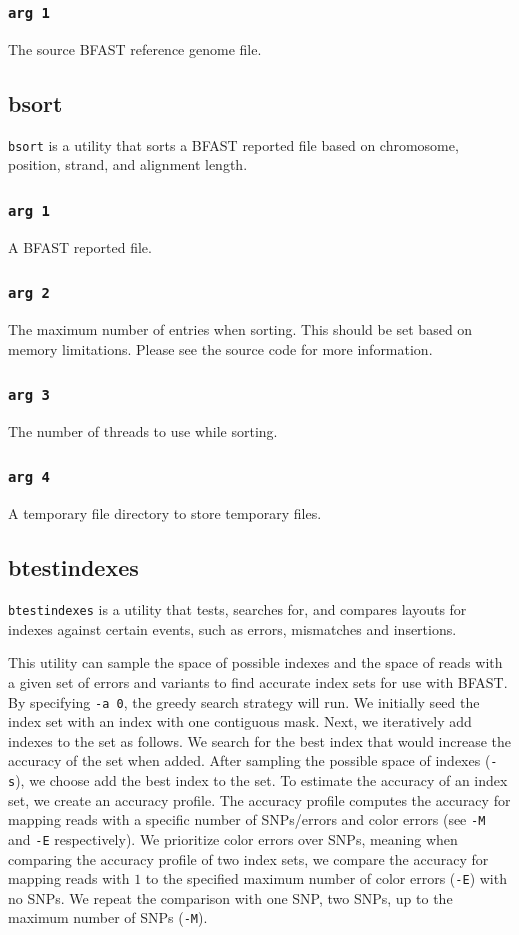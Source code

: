 \documentclass[a4paper,12pt]{book}
\newcommand{\TT}[1]{{\tt #1}} %
\newcommand{\BRGF}{BFAST reference genome file} %
\newcommand{\BRF}{BFAST reported file} %
\begin{document}
\subsubsection{\TT{arg 1}}
The source \BRGF{}.
\subsection{bsort}
\label{sec:bsort}
\TT{bsort} is a utility that sorts a \BRF{} based on chromosome, position, strand, and alignment length.
\subsubsection{\TT{arg 1}}
A \BRF{}.
\subsubsection{\TT{arg 2}}
The maximum number of entries when sorting.
This should be set based on memory limitations.
Please see the source code for more information.
\subsubsection{\TT{arg 3}}
The number of threads to use while sorting.
\subsubsection{\TT{arg 4}}
A temporary file directory to store temporary files.
\subsection{btestindexes}
\label{sec:btestindexes}
\TT{btestindexes} is a utility that tests, searches for, and compares layouts for indexes against certain events, such as errors, mismatches and insertions.

This utility can sample the space of possible indexes and the space of reads with a given set of errors and variants to find accurate index sets for use with BFAST.
By specifying \TT{-a 0}, the greedy search strategy will run.
We initially seed the index set with an index with one contiguous mask.
Next, we iteratively add indexes to the set as follows.
We search for the best index that would increase the accuracy of the set when added.
After sampling the possible space of indexes (\TT{-s}), we choose add the best index to the set.
To estimate the accuracy of an index set, we create an accuracy profile.
The accuracy profile computes the accuracy for mapping reads with a specific number of SNPs/errors and color errors (see \TT{-M} and \TT{-E} respectively).
We prioritize color errors over SNPs, meaning when comparing the accuracy profile of two index sets, we compare the accuracy for mapping reads with $1$ to the specified maximum number of color errors (\TT{-E}) with no SNPs.
We repeat the comparison with one SNP, two SNPs, up to the maximum number of SNPs (\TT{-M}).
\end{document}
